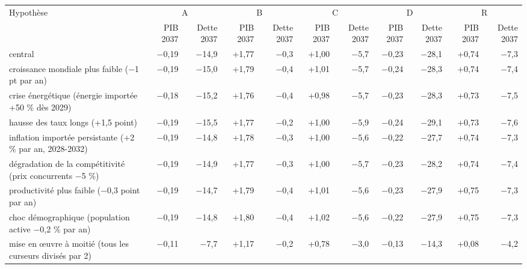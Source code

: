 \begin{tabular}{p{4.6cm}rrrrrrrrrr}
\toprule
Hypothèse & \multicolumn{2}{c}{A} & \multicolumn{2}{c}{B} & \multicolumn{2}{c}{C} & \multicolumn{2}{c}{D} & \multicolumn{2}{c}{R} \\
 & PIB 2037 & Dette 2037 & PIB 2037 & Dette 2037 & PIB 2037 & Dette 2037 & PIB 2037 & Dette 2037 & PIB 2037 & Dette 2037 \\
\midrule
central & $-$0{,}19 & $-$14{,}9 & +1{,}77 & $-$0{,}3 & +1{,}00 & $-$5{,}7 & $-$0{,}23 & $-$28{,}1 & +0{,}74 & $-$7{,}3 \\
croissance mondiale plus faible (−1 pt par an) & $-$0{,}19 & $-$15{,}0 & +1{,}79 & $-$0{,}4 & +1{,}01 & $-$5{,}7 & $-$0{,}24 & $-$28{,}3 & +0{,}74 & $-$7{,}4 \\
crise énergétique (énergie importée +50 \% dès 2029) & $-$0{,}18 & $-$15{,}2 & +1{,}76 & $-$0{,}4 & +0{,}98 & $-$5{,}7 & $-$0{,}23 & $-$28{,}3 & +0{,}73 & $-$7{,}5 \\
hausse des taux longs (+1,5 point) & $-$0{,}19 & $-$15{,}5 & +1{,}77 & $-$0{,}2 & +1{,}00 & $-$5{,}9 & $-$0{,}24 & $-$29{,}1 & +0{,}73 & $-$7{,}6 \\
inflation importée persistante (+2 \% par an, 2028-2032) & $-$0{,}19 & $-$14{,}8 & +1{,}78 & $-$0{,}3 & +1{,}00 & $-$5{,}6 & $-$0{,}22 & $-$27{,}7 & +0{,}74 & $-$7{,}3 \\
dégradation de la compétitivité (prix concurrents −5 \%) & $-$0{,}19 & $-$14{,}9 & +1{,}77 & $-$0{,}3 & +1{,}00 & $-$5{,}7 & $-$0{,}23 & $-$28{,}2 & +0{,}74 & $-$7{,}4 \\
productivité plus faible (−0,3 point par an) & $-$0{,}19 & $-$14{,}7 & +1{,}79 & $-$0{,}4 & +1{,}01 & $-$5{,}6 & $-$0{,}23 & $-$27{,}9 & +0{,}75 & $-$7{,}3 \\
choc démographique (population active −0,2 \% par an) & $-$0{,}19 & $-$14{,}8 & +1{,}80 & $-$0{,}4 & +1{,}02 & $-$5{,}6 & $-$0{,}22 & $-$27{,}9 & +0{,}75 & $-$7{,}3 \\
\midrule
mise en œuvre à moitié (tous les curseurs divisés par 2) & $-$0{,}11 & $-$7{,}7 & +1{,}17 & $-$0{,}2 & +0{,}78 & $-$3{,}0 & $-$0{,}13 & $-$14{,}3 & +0{,}08 & $-$4{,}2 \\
\bottomrule
\end{tabular}
